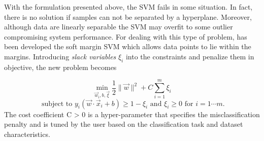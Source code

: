 With the formulation presented above, the SVM fails in some situation. In fact, there is no solution if samples can not be separated by a hyperplane. Moreover, although data are linearly separable the SVM may overfit to some outlier compromising system performance. For dealing with this type of problem, has been developed the soft margin SVM \cite{cortes95} which allows data points to lie within the margins. Introducing \textit{slack variables} $\xi_i$ into the constraints and penalize them in objective, the new problem becomes


\begin{equation}
\label{eq:slak_lagrangian_svm_opt_problem}
\min_{\vec{w}_i, b, \vec{\xi}} \frac{1}{2} \|\vec{w}\|^2 +  C\sum_{i = 1}^{m}\xi_i 
\end{equation}
\begin{equation}\nonumber
\textrm{ subject to } y_i( \vec{w}\cdot\vec{x}_i + b)  \geq 1 - \xi_i \textrm{ and } \xi_i \geq 0 \textrm{ for } i = 1 \cdots m.
\end{equation}
The cost coefficient C > 0 is a hyper-parameter that specifies the misclassification penalty and is tuned by the user based on the classification task and dataset characteristics.
